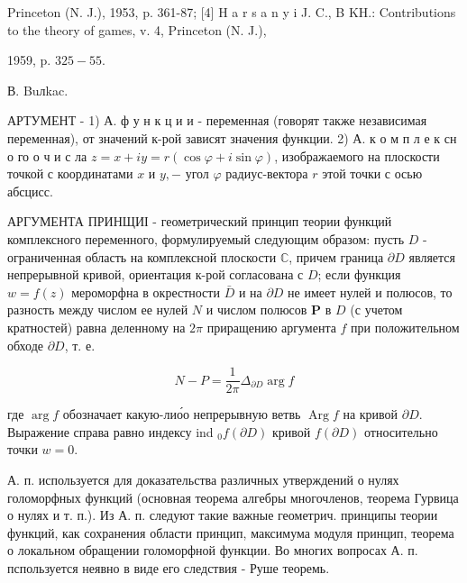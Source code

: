 \documentclass[10pt]{article}
\begin{document}
Princeton (N. J.), 1953, p. 361-87; [4] H a r s a n y i J. C., B KH.: Contributions to the theory of games, v. 4, Princeton (N. J.),

1959, p. $325-55$.

В. Buлkac.



АРТУМЕНТ - 1) А. ф у н к ц и и - переменная (говорят также независимая переменная), от значений к-рой зависят значения функции. 2) А. к о м п л е к сн о го о ч и с ла $z=x+i y=r(\cos \varphi+i \sin \varphi)$, изображаемого на плоскости точкой с координатами $x$ и $y,-$ угол $\varphi$ радиус-вектора $r$ этой точки с осью абсцисс.



АРГУМЕНТА ПРИНЩИІ - геометрический принцип теории функций комплексного переменного, формулируемый следующим образом: пусть $D$ - ограниченная область на комплексной плоскости $\mathbb{C}$, причем граница $\partial D$ является непрерывной кривой, ориентация к-рой согласована с $D$; если функция $w=f(z)$ мероморфна в окрестности $\bar{D}$ и на $\partial D$ не имеет нулей и полюсов, то разность между числом ее нулей $N$ и числом полюсов $\boldsymbol{P}$ в $D$ (с учетом кратностей) равна деленному на $2 \pi$ приращению аргумента $f$ при положительном обходе $\partial D$, т. е.



\[

N-P=\frac{1}{2 \pi} \Delta_{\partial D} \arg f

\]



где $\arg f$ обозначает какую-лио́о непрерывную ветвь $\operatorname{Arg} f$ на кривой $\partial D$. Выражение справа равно индексу ind $_{0} f(\partial D)$ кривой $f(\partial D)$ относительно точки $w=0$.



А. п. используется для доказательства различных утверждений о нулях голоморфных функций (основная теорема алгебры многочленов, теорема Гурвица о нулях и т. п.). Из А. п. следуют такие важные геометрич. принципы теории функций, как сохранения области принцип, максимума модуля принцип, теорема о локальном обращении голоморфной функции. Во многих вопросах А. п. пспользуется неявно в виде его следствия - Руше теоремь.
\end{document}
